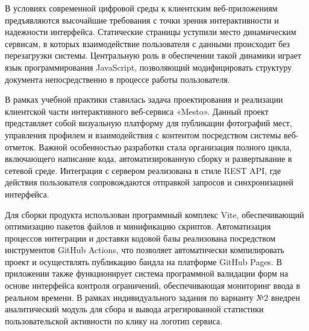 \documentclass[bachelor, och, pract, times]{SCWorks}
\begin{document}


\date{2026}

\maketitle

\secNumbering

\tableofcontents

\intro
В условиях современной цифровой среды к клиентским веб-приложениям
предъявляются высочайшие требования с точки зрения интерактивности и надежности
интерфейса. Статические страницы уступили место динамическим сервисам, в
которых взаимодействие пользователя с данными происходит без перезагрузки
системы. Центральную роль в обеспечении такой динамики играет язык
программирования JavaScript, позволяющий модифицировать структуру документа
непосредственно в процессе работы пользователя.\cite{mdn_javascript_overview}

В рамках учебной практики ставилась задача проектирования и реализации
клиентской части интерактивного веб-сервиса «Mesto». Данный проект представляет
собой визуальную платформу для публикации фотографий мест, управления профилем
и взаимодействия с контентом посредством системы веб-отметок. Важной
особенностью разработки стала организация полного цикла, включающего написание
кода, автоматизированную сборку и развертывание в сетевой среде. Интеграция с
сервером реализована в стиле REST API, где действия пользователя сопровождаются
отправкой запросов и синхронизацией интерфейса.

Для сборки продукта использован программный комплекс Vite, обеспечивающий
оптимизацию пакетов файлов и минификацию скриптов. Автоматизация процессов
интеграции и доставки кодовой базы реализована посредством инструментов GitHub
Actions, что позволяет автоматически компилировать проект и осуществлять
публикацию бандла на платформе GitHub Pages. В приложении также функционирует
система программной валидации форм на основе интерфейса контроля ограничений,
обеспечивающая мониторинг ввода в реальном времени. В рамках индивидуального
задания по варианту №2 внедрен аналитический модуль для сбора и вывода
агрегированной статистики пользовательской активности по клику на логотип
сервиса.
\end{document}
